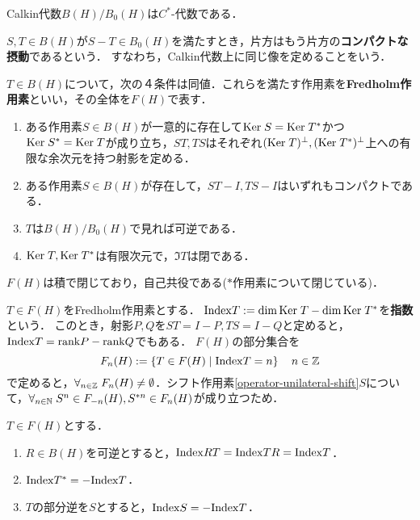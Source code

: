 \documentclass[uplatex,dvipdfmx]{jsreport}
\begin{document}
\begin{lemma}
    Calkin代数$B(H)/B_0(H)$は$C^*$-代数である．
\end{lemma}

\begin{definition}
    $S,T\in B(H)$が$S-T\in B_0(H)$を満たすとき，片方はもう片方の\textbf{コンパクトな摂動}であるという．
    すなわち，Calkin代数上に同じ像を定めることをいう．
\end{definition}

\begin{proposition}
    $T\in B(H)$について，次の４条件は同値．これらを満たす作用素を\textbf{Fredholm作用素}といい，その全体を$F(H)$で表す．
    \begin{enumerate}
        \item ある作用素$S\in B(H)$が一意的に存在して$\mathrm{Ker}\; S=\mathrm{Ker}\; T^*$かつ$\mathrm{Ker}\; S^*=\mathrm{Ker}\; T$が成り立ち，$ST,TS$はそれぞれ$(\mathrm{Ker}\; T)^\perp,(\mathrm{Ker}\; T^*)^\perp$上への有限な余次元を持つ射影を定める．
        \item ある作用素$S\in B(H)$が存在して，$ST-I,TS-I$はいずれもコンパクトである．
        \item $T$は$B(H)/B_0(H)$で見れば可逆である．
        \item $\mathrm{Ker}\; T,\mathrm{Ker}\; T^*$は有限次元で，$\Im T$は閉である．
    \end{enumerate}
\end{proposition}
\begin{remarks}
    $F(H)$は積で閉じており，自己共役である($*$作用素について閉じている)．
\end{remarks}

\begin{definition}
    $T\in F(H)$をFredholm作用素とする．
    $\mathrm{Index} T:=\dim\mathrm{Ker}\; T-\dim\mathrm{Ker}\; T^*$を\textbf{指数}という．
    このとき，射影$P,Q$を$ST=I-P,TS=I-Q$と定めると，$\mathrm{Index} T=\mathrm{rank} P-\mathrm{rank} Q$でもある．
    $F(H)$の部分集合を
    \[F_n(H):=\left\{T\in F(H)\mid\mathrm{Index} T=n\right\}\quad n\in\mathbb{Z}\]
    で定めると，$\forall_{n\in\mathbb{Z}}\;F_n(H)\ne\emptyset$．シフト作用素\ref{operator-unilateral-shift}$S$について，$\forall_{n\in\mathbb{N}}\;S^n\in F_{-n}(H),S^{*n}\in F_n(H)$が成り立つため．
\end{definition}

\begin{lemma}
    $T\in F(H)$とする．
    \begin{enumerate}
        \item $R\in B(H)$を可逆とすると，$\mathrm{Index} RT=\mathrm{Index} TR=\mathrm{Index} T$．
        \item $\mathrm{Index} T^*=-\mathrm{Index} T$．
        \item $T$の部分逆を$S$とすると，$\mathrm{Index} S=-\mathrm{Index} T$．
    \end{enumerate}
\end{lemma}
\end{document}
